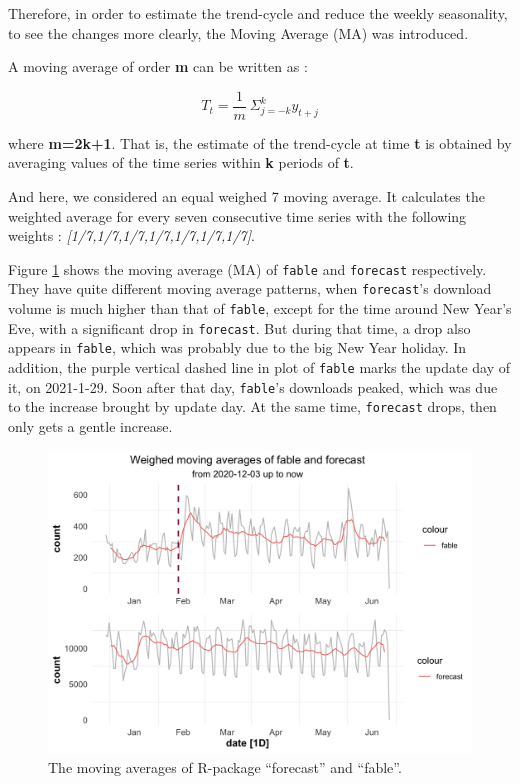 \documentclass[
]{book}
\begin{document}
Therefore, in order to estimate the trend-cycle and reduce the weekly seasonality, to see the changes more clearly, the Moving Average (MA) was introduced\autocite{movingaverage}.

A moving average of order \textbf{m} can be written as :

\[T_t = \frac1m\ \Sigma_{j = -k}^{k}y_{t+j} \]

where \textbf{m=2k+1}. That is, the estimate of the trend-cycle at time \textbf{t} is obtained by averaging values of the time series within \textbf{k} periods of \textbf{t}.

And here, we considered an equal weighed 7 moving average. It calculates the weighted average for every seven consecutive time series with the following weights : \emph{{[}1/7,1/7,1/7,1/7,1/7,1/7,1/7{]}}.

Figure \ref{fig:ff-ma} shows the moving average (MA) of \texttt{fable} and \texttt{forecast} respectively. They have quite different moving average patterns, when \texttt{forecast}'s download volume is much higher than that of \texttt{fable}, except for the time around New Year's Eve, with a significant drop in \texttt{forecast}. But during that time, a drop also appears in \texttt{fable}, which was probably due to the big New Year holiday. In addition, the purple vertical dashed line in plot of \texttt{fable} marks the update day of it, on 2021-1-29. Soon after that day, \texttt{fable}'s downloads peaked, which was due to the increase brought by update day. At the same time, \texttt{forecast} drops, then only gets a gentle increase.



\begin{figure}

{\centering \includegraphics{figures/ff-ma-1} 

}

\caption{The moving averages of R-package ``forecast'' and ``fable''.}\label{fig:ff-ma}
\end{figure}
\end{document}
